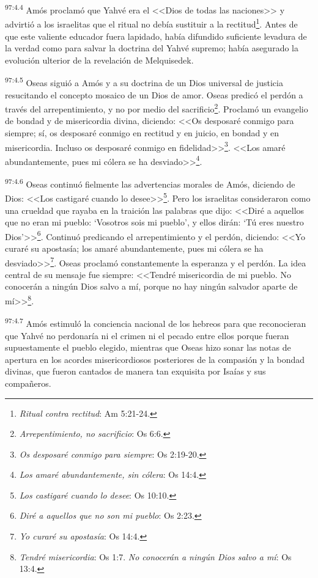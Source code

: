 \par
\textsuperscript{97:4.4} Amós proclamó que Yahvé era el <<Dios de todas las naciones>> y advirtió a los israelitas que el ritual no debía sustituir a la rectitud\footnote{\textit{Ritual contra rectitud}: Am 5:21-24.}. Antes de que este valiente educador fuera lapidado, había difundido suficiente levadura de la verdad como para salvar la doctrina del Yahvé supremo; había asegurado la evolución ulterior de la revelación de Melquisedek.

\par
\textsuperscript{97:4.5} Oseas siguió a Amós y a su doctrina de un Dios universal de justicia resucitando el concepto mosaico de un Dios de amor. Oseas predicó el perdón a través del arrepentimiento, y no por medio del sacrificio\footnote{\textit{Arrepentimiento, no sacrificio}: Os 6:6.}. Proclamó un evangelio de bondad y de misericordia divina, diciendo: <<Os desposaré conmigo para siempre; sí, os desposaré conmigo en rectitud y en juicio, en bondad y en misericordia. Incluso os desposaré conmigo en fidelidad>>\footnote{\textit{Os desposaré conmigo para siempre}: Os 2:19-20.}. <<Los amaré abundantemente, pues mi cólera se ha desviado>>\footnote{\textit{Los amaré abundantemente, sin cólera}: Os 14:4.}.

\par
\textsuperscript{97:4.6} Oseas continuó fielmente las advertencias morales de Amós, diciendo de Dios: <<Los castigaré cuando lo desee>>\footnote{\textit{Los castigaré cuando lo desee}: Os 10:10.}. Pero los israelitas consideraron como una crueldad que rayaba en la traición las palabras que dijo: <<Diré a aquellos que no eran mi pueblo: `Vosotros sois mi pueblo', y ellos dirán: `Tú eres nuestro Dios'>>\footnote{\textit{Diré a aquellos que no son mi pueblo}: Os 2:23.}. Continuó predicando el arrepentimiento y el perdón, diciendo: <<Yo curaré su apostasía; los amaré abundantemente, pues mi cólera se ha desviado>>\footnote{\textit{Yo curaré su apostasía}: Os 14:4.}. Oseas proclamó constantemente la esperanza y el perdón. La idea central de su mensaje fue siempre: <<Tendré misericordia de mi pueblo. No conocerán a ningún Dios salvo a mí, porque no hay ningún salvador aparte de mí>>\footnote{\textit{Tendré misericordia}: Os 1:7. \textit{No conocerán a ningún Dios salvo a mí}: Os 13:4.}.

\par
\textsuperscript{97:4.7} Amós estimuló la conciencia nacional de los hebreos para que reconocieran que Yahvé no perdonaría ni el crimen ni el pecado entre ellos porque fueran supuestamente el pueblo elegido, mientras que Oseas hizo sonar las notas de apertura en los acordes misericordiosos posteriores de la compasión y la bondad divinas, que fueron cantados de manera tan exquisita por Isaías y sus compañeros.

